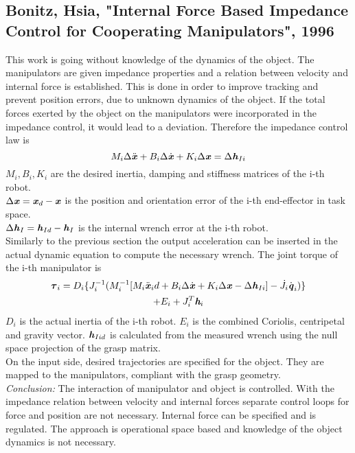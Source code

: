 \documentclass[conference]{IEEEtran}
\begin{document}
\subsection{Bonitz, Hsia, "Internal Force Based Impedance Control for Cooperating Manipulators", 1996}
This work is going without knowledge of the dynamics of the object. The manipulators are given impedance properties and a relation between velocity and internal force is established. This is done in order to improve tracking and prevent position errors, due to unknown dynamics of the object. If the total forces exerted by the object on the manipulators were incorporated in the impedance control, it would lead to a deviation. Therefore the impedance control law is
\begin{equation}
M_i\Delta\ddot{\textbf{\textit{x}}} + B_i\Delta\dot{\textbf{\textit{x}}} + K_i\Delta\textbf{\textit{x}} = \Delta\textbf{\textit{h}}_{Ii}
\end{equation}
$ M_i, B_i, K_i $ are the desired inertia, damping and stiffness matrices of the i-th robot.\\ $ \Delta\textbf{\textit{x}} = \textbf{\textit{x}}_d - \textbf{\textit{x}}  $ is the position and orientation error of the i-th end-effector in task space.\\ $ \Delta\textbf{\textit{h}}_I = \textbf{\textit{h}}_{Id} - \textbf{\textit{h}}_I $ is the internal wrench error at the i-th robot.\\
Similarly to the previous section the output acceleration can be inserted in the actual dynamic equation to compute the necessary wrench. The joint torque of the i-th manipulator is
\begin{multline}
\boldsymbol{\tau}_i = D_i \{ J_i^{-1} ( M_i^{-1} [M_i\ddot{\textbf{\textit{x}}}_id + B_i\Delta\dot{\textbf{\textit{x}}} + K_i\Delta\textbf{\textit{x}} - \Delta\textbf{\textit{h}}_{Ii}] - \dot{J}_i\dot{\textbf{\textit{q}}}_i) \}\\ + E_i + J_i^T\textit{\textbf{h}}_i
\end{multline}
$ D_i $ is the actual inertia of the i-th robot. $ E_i $ is the combined Coriolis, centripetal and gravity vector. $ \textbf{\textit{h}}_{Iid} $ is calculated from the measured wrench using the null space projection of the grasp matrix.\\
On the input side, desired trajectories are specified for the object. They are mapped to the manipulators, compliant with the grasp geometry.\\
\emph{Conclusion: }The interaction of manipulator and object is controlled. With the impedance relation between velocity and internal forces separate control loops for force and position are not necessary. Internal force can be specified and is regulated. The approach is operational space based and knowledge of the object dynamics is not necessary. 
\end{document}
